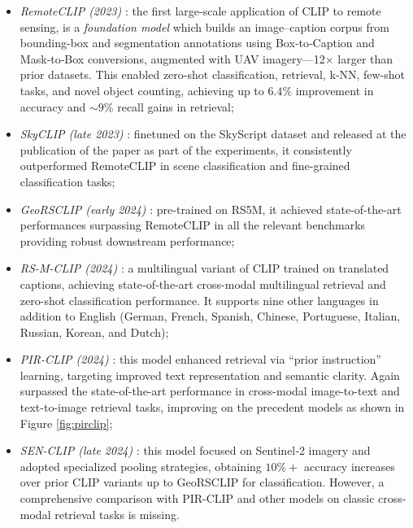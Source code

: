 \documentclass[a4paper, oneside, english]{sapthesis} %
\begin{document}
\begin{itemize}
    \item \emph{RemoteCLIP (2023)} \cite{liu2024remoteclip}: the first large-scale application of CLIP to remote sensing, is a \emph{foundation model} which builds an image–caption corpus from bounding-box and segmentation annotations using Box‑to‑Caption and Mask‑to‑Box conversions, augmented with UAV imagery—12× larger than prior datasets. This enabled zero-shot classification, retrieval, k‑NN, few-shot tasks, and novel object counting, achieving up to $6.4\%$ improvement in accuracy and $\sim 9\%$ recall gains in retrieval;
    \item \emph{SkyCLIP (late 2023)} \cite{wang2024skyscript}: finetuned on the SkyScript dataset and released at the publication of the paper as part of the experiments, it consistently outperformed RemoteCLIP in scene classification and fine-grained classification tasks;
    \item \emph{GeoRSCLIP (early 2024)} \cite{zhang2024rs5m}: pre-trained on RS5M, it achieved state-of-the-art performances surpassing RemoteCLIP in all the relevant benchmarks providing robust downstream performance;
    \item \emph{RS-M-CLIP (2024)} \cite{silva2024multilingual}: a multilingual variant of CLIP trained on translated captions, achieving state‑of‑the‑art cross-modal multilingual retrieval and zero-shot classification performance. It supports nine other languages in addition to English (German, French, Spanish, Chinese, Portuguese, Italian, Russian, Korean, and Dutch);
    \item \emph{PIR-CLIP (2024)} \cite{pan2024pir}: this model enhanced retrieval via “prior instruction” learning, targeting improved text representation and semantic clarity. Again surpassed the state-of-the-art performance in cross-modal image-to-text and text-to-image retrieval tasks, improving on the precedent models as shown in Figure \ref{fig:pirclip};
    \item \emph{SEN-CLIP (late 2024)} \cite{jain2025senclip}: this model focused on Sentinel‑2 imagery and adopted specialized pooling strategies, obtaining $10\%+$ accuracy increases over prior CLIP variants up to GeoRSCLIP for classification. However, a comprehensive comparison with PIR-CLIP and other models on classic cross-modal retrieval tasks is missing.
\end{itemize}
\end{document}
